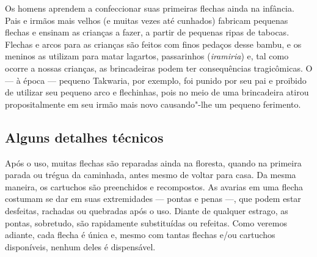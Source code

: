 Os homens aprendem a confeccionar suas primeiras flechas ainda na
infância. Pais e irmãos mais velhos (e muitas vezes até cunhados)
fabricam pequenas flechas e ensinam as crianças a fazer, a partir de
pequenas ripas de tabocas. Flechas e arcos para as crianças são feitos
com finos pedaços desse bambu, e os meninos as utilizam para matar
lagartos, passarinhos (\emph{iramiria}) e, tal como ocorre a nossas
crianças, as brincadeiras podem ter consequências tragicômicas. O --- à
época --- pequeno Takwaria, por exemplo, foi punido por seu pai e proibido
de utilizar seu pequeno arco e flechinhas, pois no meio de uma
brincadeira atirou propositalmente em seu irmão mais novo causando"-lhe
um pequeno ferimento.

\subsection{Alguns detalhes técnicos}

\forceindent
Após o uso, muitas flechas são reparadas ainda na floresta, quando na
primeira parada ou trégua da caminhada, antes mesmo de voltar para casa.
Da mesma maneira, os cartuchos são preenchidos e recompostos. As avarias
em uma flecha costumam se dar em suas extremidades --- pontas e penas ---,
que podem estar desfeitas, rachadas ou quebradas após o uso. Diante de
qualquer estrago, as pontas, sobretudo, são rapidamente substituídas ou
refeitas. Como veremos adiante, cada flecha é única e, mesmo com tantas
flechas e/ou cartuchos disponíveis, nenhum deles é dispensável.

